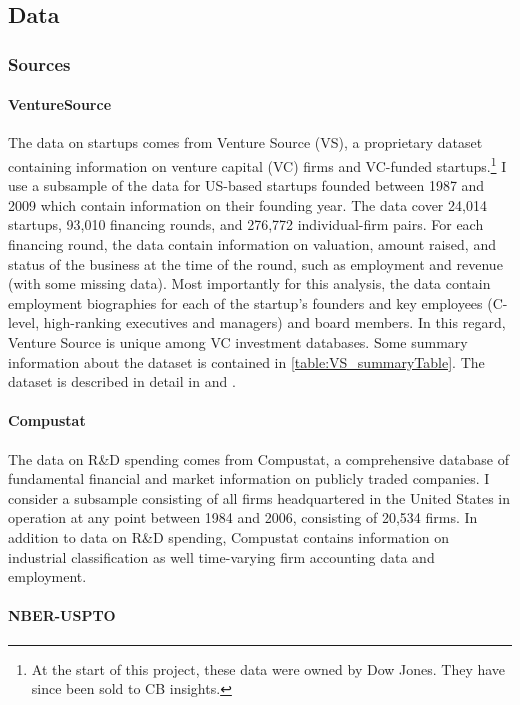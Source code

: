\documentclass[ecta,nameyear,final]{econsocart}
\theoremstyle{plain}
\theoremstyle{remark}
\begin{document}
\subsection{Data}

\subsubsection{Sources}

\paragraph{VentureSource}

The data on startups comes from Venture Source (VS), a proprietary dataset containing information on venture capital (VC) firms and VC-funded startups.\footnote{At the start of this project, these data were owned by Dow Jones. They have since been sold to CB insights.} I use a subsample of the data for US-based startups founded between 1987 and 2009 which contain information on their founding year. The data cover 24,014 startups, 93,010 financing rounds, and 276,772 individual-firm pairs. For each financing round, the data contain information on valuation, amount raised, and status of the business at the time of the round, such as employment and revenue (with some missing data). Most importantly for this analysis, the data contain employment biographies for each of the startup's founders and key employees (C-level, high-ranking executives and managers) and board members. In this regard, Venture Source is unique among VC investment databases. Some summary information about the dataset is contained in \autoref{table:VS_summaryTable}. The dataset is described in detail in \cite{kaplan_how_2002} and \cite{kaplan_venture_2016}. 

\paragraph{Compustat}

The data on R\&D spending comes from Compustat, a comprehensive database of fundamental financial and market information on publicly traded companies. I consider a subsample consisting of all firms headquartered in the United States in operation at any point between 1984 and 2006, consisting of 20,534 firms. In addition to data on R\&D spending, Compustat contains information on industrial classification as well time-varying firm accounting data and employment. 

\paragraph{NBER-USPTO}
\end{document}
